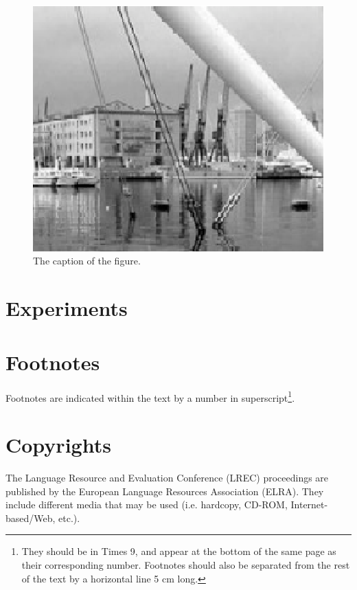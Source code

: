 \documentclass[10pt, a4paper]{article}
\begin{document}
\begin{figure}[h]
\begin{center}
\includegraphics[scale=0.5]{image1.eps} 
\caption{The caption of the figure.}
\label{fig.1}
\end{center}
\end{figure}

\section{Experiments}


\section{Footnotes}

Footnotes are indicated within the text by a number in superscript\footnote{They should be in Times 9, and appear at the bottom of the same page as their corresponding number. Footnotes should also be separated from the rest of the text by a horizontal line 5 cm long.}.

\section{Copyrights}

The Lan\-gua\-ge Re\-sour\-ce and Evalua\-tion Con\-fe\-rence (LREC) proceedings are published by the European Language Resources Association (ELRA). They include different media that may be used (i.e. hardcopy, CD-ROM, Internet-based/Web, etc.).
\end{document}
